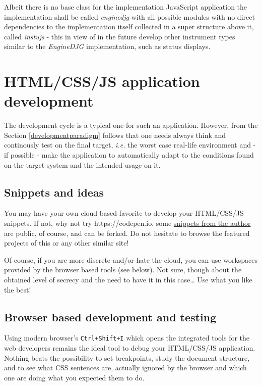 \documentclass[11pt]{article}
\begin{document}
    Albeit there is no base class for the implementation JavaScript
application the implementation shall be called \emph{enginedjg} with all
possible modules with no direct dependencies to the implementation
itself collected in a super structure above it, called \emph{instujs} -
this in view of in the future develop other instrument types similar to
the \emph{EngineDJG} implementation, such as status displays.

    \hypertarget{htmlcssjs-application-development}{%
\section{HTML/CSS/JS application
development}\label{htmlcssjs-application-development}}

    The development cycle is a typical one for such an application. However,
from the Section \ref{developmentparadigm} follows that one needs always
think and continously test on the final target, \emph{i.e.} the worst
case real-life environment and - if possible - make the application to
automatically adapt to the conditions found on the target system and the
intended usage on it.

    \hypertarget{snippets-and-ideas}{%
\subsection{Snippets and ideas}\label{snippets-and-ideas}}

    You may have your own cloud based favorite to develop your HTML/CSS/JS
snippets. If not, why not try https://codepen.io, some
\href{https://codepen.io/petrim}{snippets from the author} are public,
of course, and can be forked. Do not hesitate to browse the featured
projects of this or any other similar site!

    Of course, if you are more discrete and/or hate the cloud, you can use
workspaces provided by the browser based tools (see below). Not sure,
though about the obtained level of secrecy and the need to have it in
this case\ldots{} Use what you like the best!

    \hypertarget{browser-based-development-and-testing}{%
\subsection{Browser based development and
testing}\label{browser-based-development-and-testing}}

    Using modern browser's \texttt{Ctrl+Shift+I} which opens the integrated
tools for the web developers remains the ideal tool to debug your
HTML/CSS/JS application. Nothing beats the possibility to set
breakpoints, study the document structure, and to see what CSS sentences
are, actually ignored by the browser and which one are doing what you
expected them to do.
\end{document}
